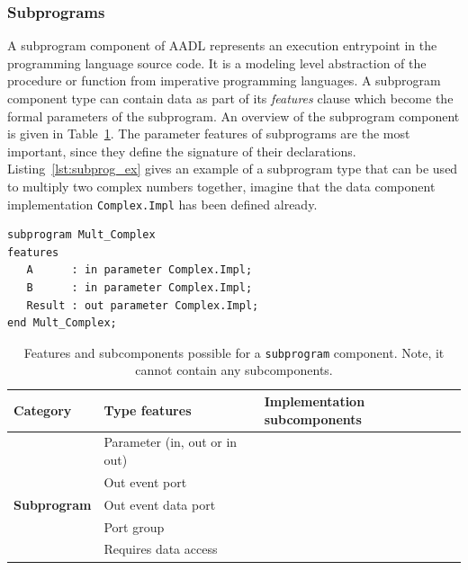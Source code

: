 \subsubsection{Subprograms} A subprogram component of AADL represents an
execution entrypoint in the programming language source code. It is a
modeling level abstraction of the procedure or function from
imperative programming languages. A subprogram component type can
contain data as part of its \emph{features} clause which become the
formal parameters of the subprogram. An overview of the subprogram
component is given in Table~\ref{tab:subprog_rules}. The parameter
features of subprograms are the most important, since they define the
signature of their declarations. Listing~\ref{lst:subprog_ex} gives an
example of a subprogram type that can be used to multiply two complex
numbers together, imagine that the data component implementation
\texttt{Complex.Impl} has been defined already.

\begin{center}
\begin{minipage}{0.75\linewidth}
\lstset{language=aadl}
\begin{lstlisting}[label=lst:subprog_ex, caption=A subprogram type
    definition to multiply two complex numbers]
subprogram Mult_Complex
features
   A      : in parameter Complex.Impl;
   B      : in parameter Complex.Impl;
   Result : out parameter Complex.Impl;
end Mult_Complex;
\end{lstlisting}
\end{minipage}
\end{center}

\begin{table}
\centering
\begin{tabular}{|l|l|l|}
\hline
\textbf{Category} & \textbf{Type features} & \textbf{Implementation
  subcomponents} \\
\hline
 & Parameter (in, out or in out) & \\
 & Out event port & \\
\textbf{Subprogram} & Out event data port & \\
 & Port group & \\
 & Requires data access & \\
\hline
\end{tabular}
\caption{Features and subcomponents possible for a \texttt{subprogram}
  component. Note, it cannot contain any subcomponents.}
\label{tab:subprog_rules}
\end{table}

